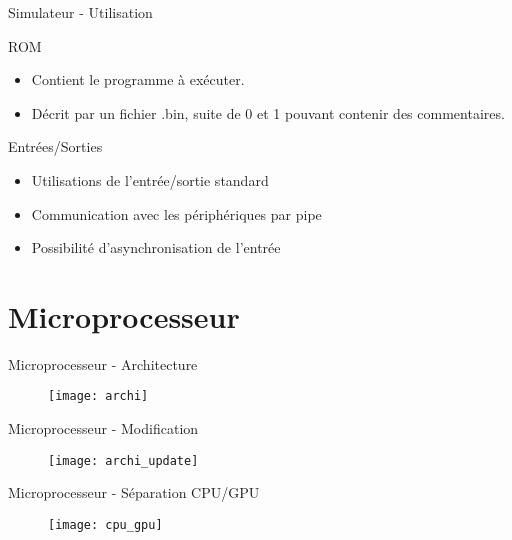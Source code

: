 \documentclass{beamer}
\begin{document}
\begin{frame}{Simulateur - Utilisation}
	\begin{block}{ROM}
		\begin{itemize}
			\item Contient le programme à exécuter.
			\item Décrit par un fichier .bin, suite de 0 et 1 pouvant contenir des commentaires.
		\end{itemize}
	\end{block}
	
	\pause
	
	\begin{block}{Entrées/Sorties}
		\begin{itemize}
			\item Utilisations de l'entrée/sortie standard
			\item Communication avec les périphériques par pipe
			\item Possibilité d'asynchronisation de l'entrée
		\end{itemize}
	\end{block}

\end{frame}



\section{Microprocesseur}
\begin{frame}{Microprocesseur - Architecture}
	\begin{figure}
		\centering
		\texttt{[image: archi]}
	\end{figure}
\end{frame}

\begin{frame}{Microprocesseur - Modification}
	\begin{figure}
		\centering
		\texttt{[image: archi\_update]}
	\end{figure}
\end{frame}

\begin{frame}{Microprocesseur - Séparation CPU/GPU}
	\begin{figure}
		\centering
		\texttt{[image: cpu\_gpu]}
	\end{figure}
\end{frame}
\end{document}
